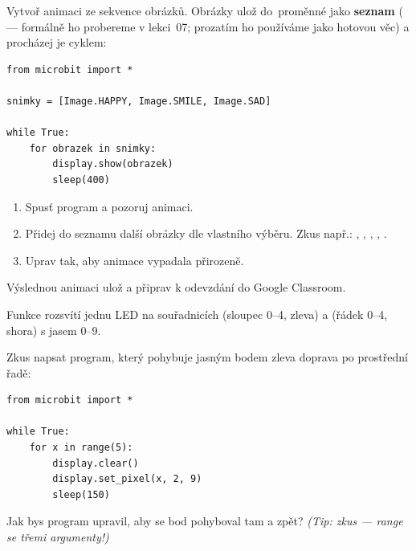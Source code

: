\begin{ukol}

Vytvoř animaci ze sekvence obrázků. Obrázky ulož do~proměnné jako \textbf{seznam}
(\pyinline{[...]} — formálně ho probereme v lekci~07; prozatím ho používáme
jako hotovou věc) a procházej je  cyklem:

\begin{lstlisting}
from microbit import *

snimky = [Image.HAPPY, Image.SMILE, Image.SAD]

while True:
    for obrazek in snimky:
        display.show(obrazek)
        sleep(400)
\end{lstlisting}

\begin{enumerate}
  \item Spusť program a pozoruj animaci.
  \item Přidej do seznamu  další obrázky dle vlastního výběru.
        Zkus např.: , ,
        , , .
  \item Uprav  tak, aby animace vypadala přirozeně.
\end{enumerate}

\medskip
Výslednou animaci ulož a připrav k odevzdání do Google Classroom.

\end{ukol}

\begin{ukol}

Funkce  rozsvítí jednu LED na souřadnicích
 (sloupec 0--4, zleva) a  (řádek 0--4, shora) s jasem 0--9.

Zkus napsat program, který pohybuje jasným bodem zleva doprava po prostřední řadě:

\begin{lstlisting}
from microbit import *

while True:
    for x in range(5):
        display.clear()
        display.set_pixel(x, 2, 9)
        sleep(150)
\end{lstlisting}

Jak bys program upravil, aby se bod pohyboval tam a zpět?
\textit{(Tip: zkus  — range se třemi argumenty!)}

\odpoved[2.5cm]

\end{ukol}

